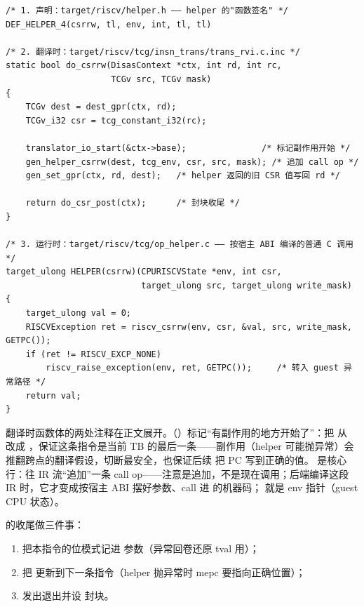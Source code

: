 \begin{lstlisting}[caption={csrrw helper 的三段流程：声明、翻译时、运行时（节选）},label={lst:csrrw-flow}]
/* 1. 声明：target/riscv/helper.h —— helper 的"函数签名" */
DEF_HELPER_4(csrrw, tl, env, int, tl, tl)

/* 2. 翻译时：target/riscv/tcg/insn_trans/trans_rvi.c.inc */
static bool do_csrrw(DisasContext *ctx, int rd, int rc,
                     TCGv src, TCGv mask)
{
    TCGv dest = dest_gpr(ctx, rd);
    TCGv_i32 csr = tcg_constant_i32(rc);

    translator_io_start(&ctx->base);               /* 标记副作用开始 */
    gen_helper_csrrw(dest, tcg_env, csr, src, mask); /* 追加 call op */
    gen_set_gpr(ctx, rd, dest);   /* helper 返回的旧 CSR 值写回 rd */

    return do_csr_post(ctx);      /* 封块收尾 */
}

/* 3. 运行时：target/riscv/tcg/op_helper.c —— 按宿主 ABI 编译的普通 C 调用 */
target_ulong HELPER(csrrw)(CPURISCVState *env, int csr,
                           target_ulong src, target_ulong write_mask)
{
    target_ulong val = 0;
    RISCVException ret = riscv_csrrw(env, csr, &val, src, write_mask, GETPC());
    if (ret != RISCV_EXCP_NONE)
        riscv_raise_exception(env, ret, GETPC());     /* 转入 guest 异常路径 */
    return val;
}
\end{lstlisting}

翻译时函数体的两处注释在正文展开。（）标记“有副作用的地方开始了”：把  从  改成 ，保证这条指令是当前 TB 的最后一条——副作用（helper 可能抛异常）会推翻跨点的翻译假设，切断最安全，也保证后续  把 PC 写到正确的值。 是核心行：往 IR 流“追加”一条 call op——注意是追加，不是现在调用；后端编译这段 IR 时，它才变成按宿主 ABI 摆好参数、call 进  的机器码； 就是 env 指针（guest CPU 状态）。

 的收尾做三件事：

\begin{enumerate}[label=\arabic*.,leftmargin=2.5em,itemsep=2pt]
\item {} 把本指令的位模式记进  参数（异常回卷还原 tval 用）；
\item {} 把  更新到下一条指令（helper 抛异常时 mepc 要指向正确位置）；
\item {} 发出退出并设  封块。
\end{enumerate}

